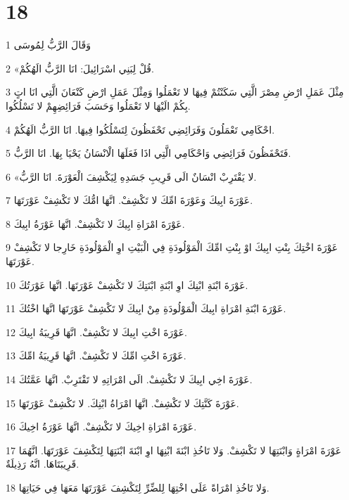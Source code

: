 \chapter{18}

\par 1 وَقَالَ الرَّبُّ لِمُوسَى
\par 2 «قُلْ لِبَنِي اسْرَائِيلَ: انَا الرَّبُّ الَهُكُمْ.
\par 3 مِثْلَ عَمَلِ ارْضِ مِصْرَ الَّتِي سَكَنْتُمْ فِيهَا لا تَعْمَلُوا وَمِثْلَ عَمَلِ ارْضِ كَنْعَانَ الَّتِي انَا اتٍ بِكُمْ الَيْهَا لا تَعْمَلُوا وَحَسَبَ فَرَائِضِهِمْ لا تَسْلُكُوا.
\par 4 احْكَامِي تَعْمَلُونَ وَفَرَائِضِي تَحْفَظُونَ لِتَسْلُكُوا فِيهَا. انَا الرَّبُّ الَهُكُمْ.
\par 5 فَتَحْفَظُونَ فَرَائِضِي وَاحْكَامِي الَّتِي اذَا فَعَلَهَا الْانْسَانُ يَحْيَا بِهَا. انَا الرَّبُّ.
\par 6 «لا يَقْتَرِبْ انْسَانٌ الَى قَرِيبِ جَسَدِهِ لِيَكْشِفَ الْعَوْرَةَ. انَا الرَّبُّ.
\par 7 عَوْرَةَ ابِيكَ وَعَوْرَةَ امِّكَ لا تَكْشِفْ. انَّهَا امُّكَ لا تَكْشِفْ عَوْرَتَهَا.
\par 8 عَوْرَةَ امْرَاةِ ابِيكَ لا تَكْشِفْ. انَّهَا عَوْرَةُ ابِيكَ.
\par 9 عَوْرَةَ اخْتِكَ بِنْتِ ابِيكَ اوْ بِنْتِ امِّكَ الْمَوْلُودَةِ فِي الْبَيْتِ اوِ الْمَوْلُودَةِ خَارِجا لا تَكْشِفْ عَوْرَتَهَا.
\par 10 عَوْرَةَ ابْنَةِ ابْنِكَ اوِ ابْنَةِ ابْنَتِكَ لا تَكْشِفْ عَوْرَتَهَا. انَّهَا عَوْرَتُكَ.
\par 11 عَوْرَةَ ابْنَةِ امْرَاةِ ابِيكَ الْمَوْلُودَةِ مِنْ ابِيكَ لا تَكْشِفْ عَوْرَتَهَا انَّهَا اخْتُكَ.
\par 12 عَوْرَةَ اخْتِ ابِيكَ لا تَكْشِفْ. انَّهَا قَرِيبَةُ ابِيكَ.
\par 13 عَوْرَةَ اخْتِ امِّكَ لا تَكْشِفْ. انَّهَا قَرِيبَةُ امِّكَ.
\par 14 عَوْرَةَ اخِي ابِيكَ لا تَكْشِفْ. الَى امْرَاتِهِ لا تَقْتَرِبْ. انَّهَا عَمَّتُكَ.
\par 15 عَوْرَةَ كَنَّتِكَ لا تَكْشِفْ. انَّهَا امْرَاةُ ابْنِكَ. لا تَكْشِفْ عَوْرَتَهَا.
\par 16 عَوْرَةَ امْرَاةِ اخِيكَ لا تَكْشِفْ. انَّهَا عَوْرَةُ اخِيكَ.
\par 17 عَوْرَةَ امْرَاةٍ وَابْنَتِهَا لا تَكْشِفْ. وَلا تَاخُذِ ابْنَةَ ابْنِهَا اوِ ابْنَةَ ابْنَتِهَا لِتَكْشِفَ عَوْرَتَهَا. انَّهُمَا قَرِيبَتَاهَا. انَّهُ رَذِيلَةٌ.
\par 18 وَلا تَاخُذِ امْرَاةً عَلَى اخْتِهَا لِلضِّرِّ لِتَكْشِفَ عَوْرَتَهَا مَعَهَا فِي حَيَاتِهَا.
